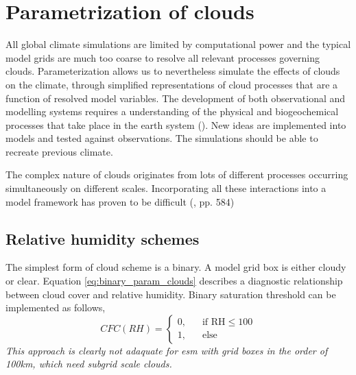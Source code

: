 \section{Parametrization of clouds} \label{sec:param_clouds}
All global climate simulations are limited by computational power and the typical model grids are much too coarse to resolve all relevant processes governing clouds. Parameterization allows us to nevertheless simulate the effects of clouds on the climate, through simplified representations of cloud processes that are a function of resolved model variables. The development of both observational and modelling systems requires a understanding of the physical and biogeochemical processes that take place in the earth system (\cite{Simmons2016Observation2016-2025}). New ideas are implemented into models and tested against observations. The simulations should be able to recreate previous climate. 

The complex nature of clouds originates from lots of different processes occurring simultaneously on different scales. Incorporating all these interactions into a model framework has proven to be difficult (\cite{IPCC_CH7_clouds}, pp. 584)
 

\subsection{Relative humidity schemes}
The simplest form of cloud scheme is a binary. A model grid box is either cloudy or clear. Equation \eqref{eq:binary_param_clouds} describes a diagnostic relationship between cloud cover and relative humidity. Binary saturation threshold can be implemented as follows,
\begin{equation} \label{eq:binary_param_clouds}
    CFC\left(RH\right) = 
     \begin{cases}
       \text{0,} &\quad\text{if RH}\le100\\
       \text{1,} &\quad\text{else}
     \end{cases}
\end{equation}
\textit{This approach is clearly not adaquate for \acrshort{esm} with grid boxes in the order of 100km, which need subgrid scale clouds.} \cite{Tomkins2005}

